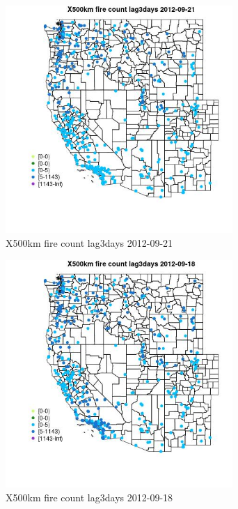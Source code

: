 \begin{figure} 
\centering  
\includegraphics[width=0.77\textwidth]{Code_Outputs/Report_ML_input_PM25_Step4_part_e_de_duplicated_aves_compiled_2019-05-14wNAs_MapObsX500km_fire_count_lag3days2012-09-21.jpg} 
\caption{\label{fig:Report_ML_input_PM25_Step4_part_e_de_duplicated_aves_compiled_2019-05-14wNAsMapObsX500km_fire_count_lag3days2012-09-21}X500km fire count lag3days 2012-09-21} 
\end{figure} 
 

\begin{figure} 
\centering  
\includegraphics[width=0.77\textwidth]{Code_Outputs/Report_ML_input_PM25_Step4_part_e_de_duplicated_aves_compiled_2019-05-14wNAs_MapObsX500km_fire_count_lag3days2012-09-18.jpg} 
\caption{\label{fig:Report_ML_input_PM25_Step4_part_e_de_duplicated_aves_compiled_2019-05-14wNAsMapObsX500km_fire_count_lag3days2012-09-18}X500km fire count lag3days 2012-09-18} 
\end{figure} 
 

